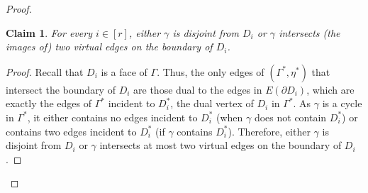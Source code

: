 \documentclass[a4paper,11pt]{article}
\numberwithin{lemma}{section}
\newtheorem{claim}[theorem]{Claim}
\newenvironment{claimproof}{\begin{proof}\renewcommand{\qedsymbol}{$\lrcorner$}}{\end{proof}}
\begin{document}
\begin{proof}
\begin{claim}
 For every $i \in [r]$, either $\gamma$ is disjoint from $D_i$ or $\gamma$ intersects (the images of) two virtual edges on the boundary of $D_i$.
\end{claim}
\begin{claimproof}
 Recall that $D_i$ is a face of $\varGamma$.
 Thus, the only edges of $(\varGamma^*,\eta^*)$ that intersect the boundary of $D_i$ are those dual to the edges in $E(\partial D_i)$, which are exactly the edges of $\varGamma^*$ incident to $D_i^*$, the dual vertex of $D_i$ in $\varGamma^*$.
 As $\gamma$ is a cycle in $\varGamma^*$, it either contains no edges incident to $D_i^*$ (when $\gamma$ does not contain $D_i^*$) or contains two edges incident to $D_i^*$ (if $\gamma$ contains $D_i^*$).
 Therefore, either $\gamma$ is disjoint from $D_i$ or $\gamma$ intersects at most two virtual edges on the boundary of $D_i$.
\end{claimproof}


\end{proof}
\end{document}
